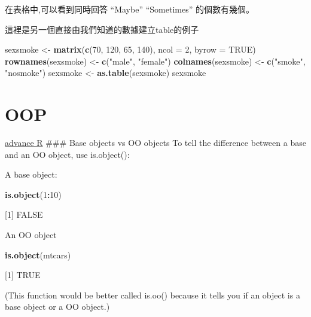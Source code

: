 \documentclass[]{book}
\newenvironment{Shaded}{\begin{snugshade}}{\end{snugshade}}
\newcommand{\KeywordTok}[1]{\textcolor[rgb]{0.13,0.29,0.53}{\textbf{#1}}}
\newcommand{\DataTypeTok}[1]{\textcolor[rgb]{0.13,0.29,0.53}{#1}}
\newcommand{\DecValTok}[1]{\textcolor[rgb]{0.00,0.00,0.81}{#1}}
\newcommand{\StringTok}[1]{\textcolor[rgb]{0.31,0.60,0.02}{#1}}
\newcommand{\OtherTok}[1]{\textcolor[rgb]{0.56,0.35,0.01}{#1}}
\newcommand{\OperatorTok}[1]{\textcolor[rgb]{0.81,0.36,0.00}{\textbf{#1}}}
\newcommand{\NormalTok}[1]{#1}
\theoremstyle{definition}
\theoremstyle{definition}
\theoremstyle{definition}
\theoremstyle{remark}
\begin{document}
在表格中,可以看到同時回答 ``Maybe'' ``Sometimes'' 的個數有幾個。

這裡是另一個直接由我們知道的數據建立table的例子

\begin{Shaded}
\begin{Highlighting}[]
\NormalTok{sexsmoke <-}\StringTok{ }\KeywordTok{matrix}\NormalTok{(}\KeywordTok{c}\NormalTok{(}\DecValTok{70}\NormalTok{, }\DecValTok{120}\NormalTok{, }\DecValTok{65}\NormalTok{, }\DecValTok{140}\NormalTok{), }\DataTypeTok{ncol =} \DecValTok{2}\NormalTok{, }\DataTypeTok{byrow =} \OtherTok{TRUE}\NormalTok{)}
\KeywordTok{rownames}\NormalTok{(sexsmoke) <-}\StringTok{ }\KeywordTok{c}\NormalTok{(}\StringTok{"male"}\NormalTok{, }\StringTok{"female"}\NormalTok{)}
\KeywordTok{colnames}\NormalTok{(sexsmoke) <-}\StringTok{ }\KeywordTok{c}\NormalTok{(}\StringTok{"smoke"}\NormalTok{, }\StringTok{"nosmoke"}\NormalTok{)}
\NormalTok{sexsmoke <-}\StringTok{ }\KeywordTok{as.table}\NormalTok{(sexsmoke)}
\NormalTok{sexsmoke}
\end{Highlighting}
\end{Shaded}

\section{OOP}\label{oop}

\href{https://adv-r.hadley.nz/base-types.html}{advance R} \#\#\# Base
objects vs OO objects To tell the difference between a base and an OO
object, use is.object():

A base object:

\begin{Shaded}
\begin{Highlighting}[]
\KeywordTok{is.object}\NormalTok{(}\DecValTok{1}\OperatorTok{:}\DecValTok{10}\NormalTok{)}
\end{Highlighting}
\end{Shaded}

{[}1{]} FALSE

An OO object

\begin{Shaded}
\begin{Highlighting}[]
\KeywordTok{is.object}\NormalTok{(mtcars)}
\end{Highlighting}
\end{Shaded}

{[}1{]} TRUE

(This function would be better called is.oo() because it tells you if an
object is a base object or a OO object.)
\end{document}

